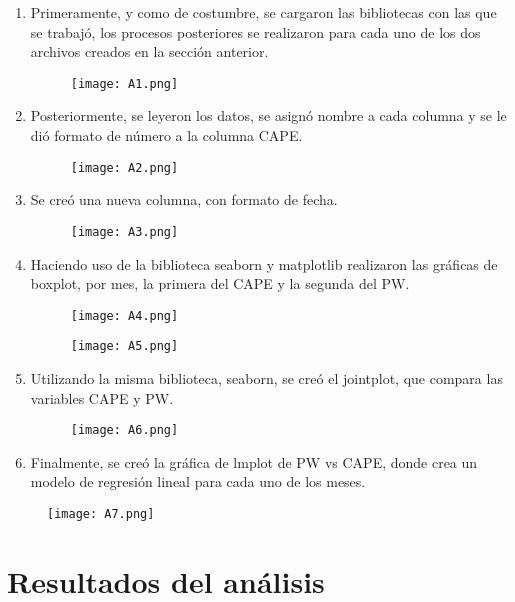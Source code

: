 \documentclass[a4paper]{article}
\begin{document}
\begin{enumerate}
\item Primeramente, y como de costumbre, se cargaron las bibliotecas con las que se trabajó, los procesos posteriores se realizaron para cada uno de los dos archivos creados en la sección anterior.
\begin{figure}[h!]
  \texttt{[image: A1.png]}
  \centering
  \label{fig:A1}
\end{figure}
\item Posteriormente, se leyeron los datos, se asignó nombre a cada columna y se le dió formato de número a la columna CAPE. 
\begin{figure}[h!]
  \texttt{[image: A2.png]}
  \centering
  \label{fig:A2}
\end{figure}
\item Se creó una nueva columna, con formato de fecha. 
\begin{figure}[h!]
  \texttt{[image: A3.png]}
  \centering
  \label{fig:A3}
\end{figure}
\item Haciendo uso de la biblioteca seaborn y matplotlib realizaron las gráficas de boxplot, por mes, la primera del CAPE y la segunda del PW.
\begin{figure}[h!]
  \texttt{[image: A4.png]}
  \centering
  \label{fig:A4}
\end{figure}
\begin{figure}[h!]
  \texttt{[image: A5.png]}
  \centering
  \label{fig:A5}
\end{figure}
\item Utilizando la misma biblioteca, seaborn, se creó el jointplot, que compara las variables CAPE y PW. 
\begin{figure}[h!]
  \texttt{[image: A6.png]}
  \centering
  \label{fig:A6}
\end{figure}
\item Finalmente, se creó la gráfica de lmplot de PW vs CAPE, donde crea un modelo de regresión lineal para cada uno de los meses.
\end{enumerate}
\begin{figure}[h!]
  \texttt{[image: A7.png]}
  \centering
  \label{fig:A7}
\end{figure}

\section{Resultados del análisis}
\end{document}
